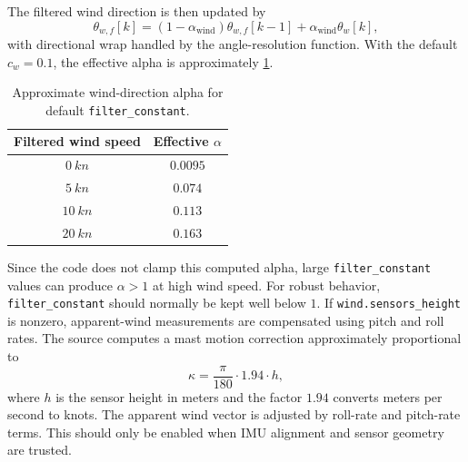 \documentclass[10pt,twocolumn]{article}
\begin{document}
The filtered wind direction is then updated by
\[
\theta_{w,f}[k]
=
(1-\alpha_{\mathrm{wind}})\theta_{w,f}[k-1]
+
\alpha_{\mathrm{wind}}\theta_w[k],
\]
with directional wrap handled by the angle-resolution function.
With the default \(c_w=0.1\), the effective alpha is approximately
\cref{tab:pypilot-wind-alpha}.
\begin{table}[!t]
\centering
\caption{Approximate wind-direction alpha for default \texttt{filter\_constant}.}
\label{tab:pypilot-wind-alpha}
\begin{tabular}{cc}
\toprule
Filtered wind speed & Effective \(\alpha\) \\
\midrule
\(\SI{0}{kn}\)  & \(\num{0.0095}\) \\
\(\SI{5}{kn}\)  & \(\num{0.074}\) \\
\(\SI{10}{kn}\) & \(\num{0.113}\) \\
\(\SI{20}{kn}\) & \(\num{0.163}\) \\
\bottomrule
\end{tabular}
\end{table}
Since the code does not clamp this computed alpha, large
\texttt{filter\_constant} values can produce \(\alpha>1\) at high wind
speed.  For robust behavior, \texttt{filter\_constant} should normally be
kept well below \(1\).
If \texttt{wind.sensors\_height} is nonzero, apparent-wind measurements
are compensated using pitch and roll rates.  The source computes a mast
motion correction approximately proportional to
\[
\kappa
=
\frac{\pi}{180}
\cdot
1.94
\cdot
h,
\]
where \(h\) is the sensor height in meters and the factor \(1.94\)
converts meters per second to knots.  The apparent wind vector is adjusted
by roll-rate and pitch-rate terms.  This should only be enabled when IMU
alignment and sensor geometry are trusted.
\end{document}

